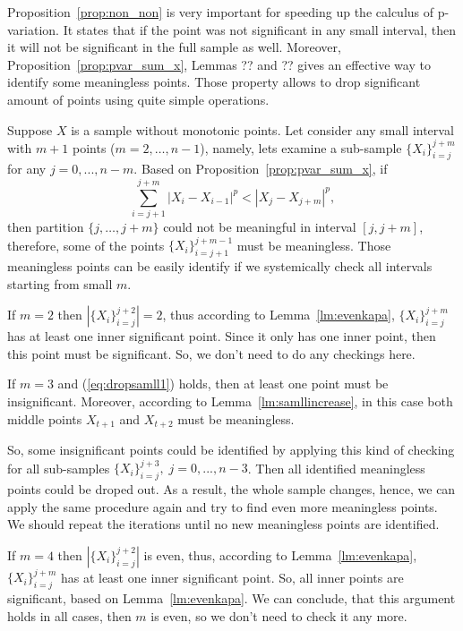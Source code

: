 \documentclass[12pt, a4paper]{article}
\numberwithin{equation}{section}
\begin{document}
Proposition~\ref{prop:non_non} is very important for speeding up the calculus of p-variation. It states that if the point was not significant in any small interval, then it will not be significant in the full sample as well. Moreover, Proposition~\ref{prop:pvar_sum_x}, Lemmas ?? and ?? gives an effective 
way to identify some meaningless points.  
Those property allows to drop significant amount of points using quite simple operations.

Suppose $X$ is a sample without monotonic points. 
Let consider any small interval with $m+1$ points ($m=2,\dots,n-1$), 
namely, lets examine a sub-sample 
$\{X_{i}\}_{i=j}^{j+m}$
for any $j=0,...,n-m$.
Based on Proposition~\ref{prop:pvar_sum_x}, if 
\begin{equation}\label{eq:dropsamll1}
  \sum_{i=j+1}^{j+m} |X_{i}-X_{i-1}|^p < |X_j-X_{j+m}|^p,
\end{equation}
then partition $\{j,\dots,j+m\}$ could not be meaningful in interval
$[j,j+m]$, therefore, some of the points $\{X_{i}\}_{i=j+1}^{j+m-1}$
must be meaningless. Those meaningless points can be easily identify 
if we systemically check all intervals starting from small $m$.

If $m=2$ then $|\{X_{i}\}_{i=j}^{j+2}|=2$, thus according to
Lemma~\ref{lm:evenkapa}, $\{X_{i}\}_{i=j}^{j+m}$ has at least one
inner significant point. Since it only has one inner point, then this point must be significant. So, we don't need to do any checkings here.

If $m=3$ and (\ref{eq:dropsamll1}) holds,
then at least one 
point must be insignificant. 
Moreover, according to Lemma~\ref{lm:samllincrease}, 
in this case both middle points $X_{t+1}$ and $X_{t+2}$ 
must be meaningless. 

So, some insignificant points could be identified by 
applying this kind of checking for all sub-samples
$\{X_{i}\}_{i=j}^{j+3},\;j=0,...,n-3$. 
Then all identified meaningless points 
could be droped out.
As a result, the whole sample changes,  
hence, 
we can apply the same procedure again and try to find 
even more meaningless points. 
We should repeat the iterations 
until no new meaningless points are 
identified.

If $m=4$ then $|\{X_{i}\}_{i=j}^{j+2}|$ is even, 
thus, according to Lemma~\ref{lm:evenkapa}, 
$\{X_{i}\}_{i=j}^{j+m}$ has at least one
inner significant point. So, all inner points are significant, 
based on Lemma~\ref{lm:evenkapa}. We can conclude, that 
this argument holds in all cases, then $m$ is even, so 
we don't need to check it any more.
\end{document}
